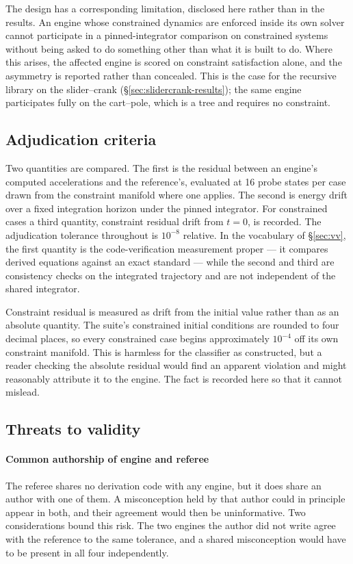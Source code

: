 \documentclass[review,12pt]{elsarticle}
\begin{document}
The design has a corresponding limitation, disclosed here rather than in the
results. An engine whose constrained dynamics are enforced inside its own solver
cannot participate in a pinned-integrator comparison on constrained systems
without being asked to do something other than what it is built to do. Where
this arises, the affected engine is scored on constraint satisfaction alone, and
the asymmetry is reported rather than concealed. This is the case for the
recursive library on the slider--crank (\S\ref{sec:slidercrank-results}); the
same engine participates fully on the cart--pole, which is a tree and requires
no constraint.

\subsection{Adjudication criteria}
Two quantities are compared. The first is the residual between an engine's
computed accelerations and the reference's, evaluated at 16 probe states per
case drawn from the constraint manifold where one applies. The second is energy
drift over a fixed integration horizon under the pinned integrator. For
constrained cases a third quantity, constraint residual drift from $t=0$, is
recorded. The adjudication tolerance throughout is $10^{-8}$ relative. In the
vocabulary of \S\ref{sec:vv}, the first quantity is the code-verification
measurement proper --- it compares derived equations against an exact standard
--- while the second and third are consistency checks on the integrated
trajectory and are not independent of the shared integrator.

Constraint residual is measured as drift from the initial value rather than as
an absolute quantity. The suite's constrained initial conditions are rounded to
four decimal places, so every constrained case begins approximately $10^{-4}$
off its own constraint manifold. This is harmless for the classifier as
constructed, but a reader checking the absolute residual would find an apparent
violation and might reasonably attribute it to the engine. The fact is recorded
here so that it cannot mislead.

\subsection{Threats to validity}\label{sec:threats}

\paragraph{Common authorship of engine and referee}
The referee shares no derivation code with any engine, but it does share an author with
one of them. A misconception held by that author could in principle appear in
both, and their agreement would then be uninformative. Two considerations bound
this risk. The two engines the author did not write agree with the reference to
the same tolerance, and a shared misconception would have to be present in all
four independently.
\end{document}

